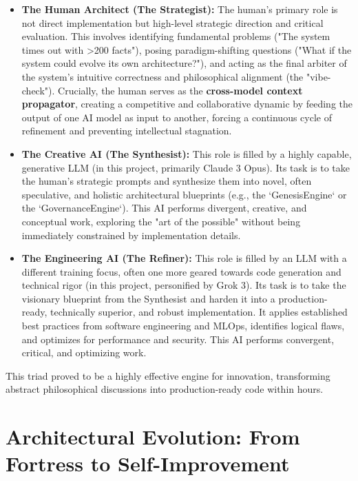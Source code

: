 \documentclass[11pt, a4paper]{article}
\begin{document}
\begin{itemize}
    \item \textbf{The Human Architect (The Strategist):} The human's primary role is not direct implementation but high-level strategic direction and critical evaluation. This involves identifying fundamental problems ("The system times out with >200 facts"), posing paradigm-shifting questions ("What if the system could evolve its own architecture?"), and acting as the final arbiter of the system's intuitive correctness and philosophical alignment (the "vibe-check"). Crucially, the human serves as the \textbf{cross-model context propagator}, creating a competitive and collaborative dynamic by feeding the output of one AI model as input to another, forcing a continuous cycle of refinement and preventing intellectual stagnation.
    
    \item \textbf{The Creative AI (The Synthesist):} This role is filled by a highly capable, generative LLM (in this project, primarily Claude 3 Opus). Its task is to take the human's strategic prompts and synthesize them into novel, often speculative, and holistic architectural blueprints (e.g., the `GenesisEngine` or the `GovernanceEngine`). This AI performs divergent, creative, and conceptual work, exploring the "art of the possible" without being immediately constrained by implementation details.
    
    \item \textbf{The Engineering AI (The Refiner):} This role is filled by an LLM with a different training focus, often one more geared towards code generation and technical rigor (in this project, personified by Grok 3). Its task is to take the visionary blueprint from the Synthesist and harden it into a production-ready, technically superior, and robust implementation. It applies established best practices from software engineering and MLOps, identifies logical flaws, and optimizes for performance and security. This AI performs convergent, critical, and optimizing work.
\end{itemize}

This triad proved to be a highly effective engine for innovation, transforming abstract philosophical discussions into production-ready code within hours.

\section{Architectural Evolution: From Fortress to Self-Improvement}
\label{sec:evolution}
\end{document}
